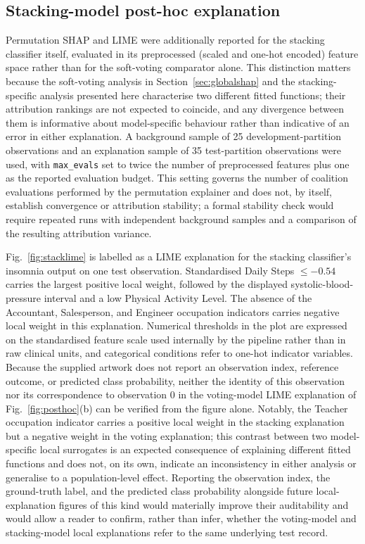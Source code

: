 \documentclass[a4paper,fleqn]{cas-dc}
\begin{document}
\subsection{Stacking-model post-hoc explanation}
\label{sec:stackpost}
Permutation SHAP and LIME were additionally reported for the stacking classifier itself, evaluated in its preprocessed (scaled and one-hot encoded) feature space rather than for the soft-voting comparator alone. This distinction matters because the soft-voting analysis in Section~\ref{sec:globalshap} and the stacking-specific analysis presented here characterise two different fitted functions; their attribution rankings are not expected to coincide, and any divergence between them is informative about model-specific behaviour rather than indicative of an error in either explanation. A background sample of 25 development-partition observations and an explanation sample of 35 test-partition observations were used, with \texttt{max\_evals} set to twice the number of preprocessed features plus one as the reported evaluation budget. This setting governs the number of coalition evaluations performed by the permutation explainer and does not, by itself, establish convergence or attribution stability; a formal stability check would require repeated runs with independent background samples and a comparison of the resulting attribution variance.
 
Fig.~\ref{fig:stacklime} is labelled as a LIME explanation for the stacking classifier's insomnia output on one test observation. Standardised Daily Steps $\leq-0.54$ carries the largest positive local weight, followed by the displayed systolic-blood-pressure interval and a low Physical Activity Level. The absence of the Accountant, Salesperson, and Engineer occupation indicators carries negative local weight in this explanation. Numerical thresholds in the plot are expressed on the standardised feature scale used internally by the pipeline rather than in raw clinical units, and categorical conditions refer to one-hot indicator variables. Because the supplied artwork does not report an observation index, reference outcome, or predicted class probability, neither the identity of this observation nor its correspondence to observation 0 in the voting-model LIME explanation of Fig.~\ref{fig:posthoc}(b) can be verified from the figure alone. Notably, the Teacher occupation indicator carries a positive local weight in the stacking explanation but a negative weight in the voting explanation; this contrast between two model-specific local surrogates is an expected consequence of explaining different fitted functions and does not, on its own, indicate an inconsistency in either analysis or generalise to a population-level effect. Reporting the observation index, the ground-truth label, and the predicted class probability alongside future local-explanation figures of this kind would materially improve their auditability and would allow a reader to confirm, rather than infer, whether the voting-model and stacking-model local explanations refer to the same underlying test record.
\end{document}
